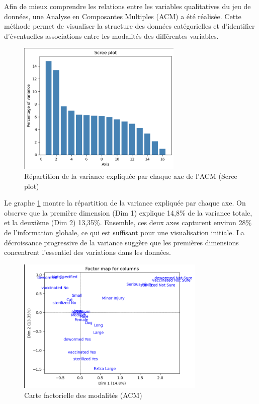\documentclass[a4paper,12pt]{article}
\begin{document}
Afin de mieux comprendre les relations entre les variables qualitatives du jeu de données, une Analyse en Composantes Multiples (ACM) a été réalisée. Cette méthode permet de visualiser la structure des données catégorielles et d’identifier d’éventuelles associations entre les modalités des différentes variables.
\begin{figure}[H]

    \centering

    \includegraphics[width=0.7\textwidth]{acm_variance.png}

    \caption{Répartition de la variance expliquée par chaque axe de l'ACM (Scree plot)}

    \label{fig:acm_scree}

\end{figure}
 
Le  graphe \ref{fig:acm_scree} montre la répartition de la variance expliquée par chaque axe. On observe que la première dimension (Dim 1) explique 14,8\% de la variance totale, et la deuxième (Dim 2) 13,35\%. Ensemble, ces deux axes capturent environ 28\% de l'information globale, ce qui est suffisant pour une visualisation initiale. La décroissance progressive de la variance suggère que les premières dimensions concentrent l’essentiel des variations dans les données.
 
\begin{figure}[H]

    \centering

    \includegraphics[width=0.8\textwidth]{acm_factor_map.png}

    \caption{Carte factorielle des modalités (ACM)}

    \label{fig:acm_modalites}

\end{figure}
 
\end{document}
